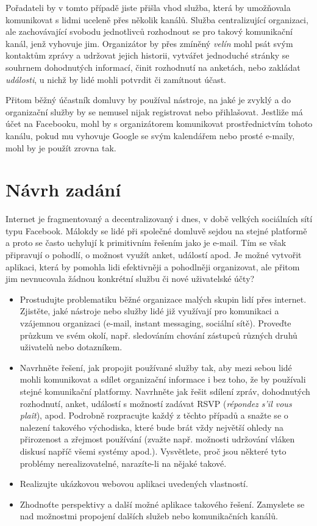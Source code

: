 \documentclass[a4paper,12pt]{article}
\begin{document}
Pořadateli by v tomto případě jiste přišla vhod služba, která by u\-mož\-ňo\-va\-la komunikovat s lidmi uceleně přes několik kanálů. Služba centralizující organizaci, ale zachovávající svobodu jednotlivců rozhodnout se pro takový komunikační kanál, jenž vyhovuje jim. Organizátor by přes zmíněný {\it velín} mohl psát svým kontaktům zprávy a udržovat jejich historii, vytvářet jednoduché stránky se souhrnem dohodnutých informací, činit rozhodnutí na anketách, nebo zakládat {\it události}, u nichž by lidé mohli potvrdit či zamítnout účast.

Přitom běžný účastník domluvy by používal nástroje, na jaké je zvyklý a do organizační služby by se nemusel nijak registrovat nebo přihlašovat. Jestliže má účet na Facebooku, mohl by s organizátorem komunikovat pro\-střed\-nic\-tvím tohoto kanálu, pokud mu vyhovuje Google se svým kalendářem nebo prosté e-maily, mohl by je použít zrovna tak.

\section{Návrh zadání}
Internet je fragmentovaný a decentralizovaný i dnes, v době velkých sociálních sítí typu Facebook. Málokdy se lidé při společné domluvě sejdou na stejné platformě a proto se často uchylují k primitivním řešením jako je e-mail. Tím se však připravují o pohodlí, o možnost využít anket, událostí apod. Je možné vytvořit aplikaci, která by pomohla lidi efektivněji a pohodlněji organizovat, ale přitom jim nevnucovala žádnou konkrétní službu či nové uživatelské účty?

\begin{itemize}
    \item Prostudujte problematiku běžné organizace malých skupin lidí přes internet. Zjistěte, jaké nástroje nebo služby lidé již využívají pro komunikaci a vzájemnou organizaci (e-mail, instant messaging, sociální sítě). Proveďte průzkum ve svém okolí, např. sledováním chování zástupců různých druhů uživatelů nebo dotazníkem.
    \item Navrhněte řešení, jak propojit používané služby tak, aby mezi sebou lidé mohli komunikovat a sdílet organizační informace i bez toho, že by používali stejné komunikační platformy. Navrhněte jak řešit sdílení
    zpráv, dohodnutých rozhodnutí, anket, událostí s možností zadávat RSVP ({\it répondez s'il vous plaît}), apod. Podrobně rozpracujte každý z těchto případů a snažte se o nalezení takového východiska, které bude brát vždy největší ohledy na přirozenost a zřejmost používání (zvažte např. možnosti udržování vláken diskusí napříč všemi systémy apod.). Vysvětlete, proč jsou některé tyto problémy nerealizovatelné, narazíte-li na nějaké takové.
    \item Realizujte ukázkovou webovou aplikaci uvedených vlastností.
    \item Zhodnoťte perspektivy a další možné aplikace takového řešení. Zamyslete se nad možnostmi propojení dalších služeb nebo komunikačních kanálů.
\end{itemize}

\end{document}

